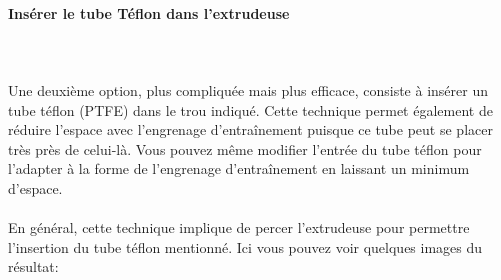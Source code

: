 \documentclass[11pt,a4paper]{article}
\begin{document}
			\paragraph{Insérer le tube Téflon dans l’extrudeuse}\mbox{}\\\\
Une deuxième option, plus compliquée mais plus efficace, consiste à insérer un tube téflon (PTFE) dans le trou indiqué. Cette technique permet également de réduire l’espace avec l’engrenage d’entraînement puisque ce tube peut se placer très près de celui-là. Vous pouvez même modifier l’entrée du tube téflon pour l’adapter à la forme de l’engrenage d’entraînement en laissant un minimum d’espace.
\\\\
En général, cette technique implique de percer l’extrudeuse pour permettre l’insertion du tube téflon mentionné. Ici vous pouvez voir quelques images du résultat:
\end{document}
